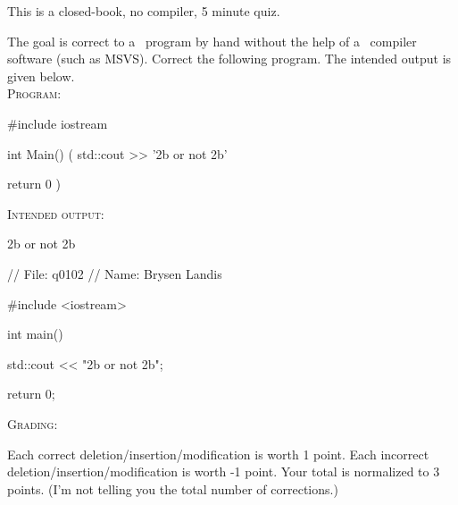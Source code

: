 

This is a closed-book, no compiler, 5 minute quiz.

\nextq
The goal is correct to a \cpp\ program by hand without the help of a \cpp\
compiler software (such as MSVS).
Correct the following program.
The intended output is given below.
\\
\textsc{Program:}
\begin{console}
#include iostream

int Main()
(
    std::cout >> '2b or not 2b'

    return 0
)
\end{console}
\textsc{Intended output:}
\begin{console}
2b or not 2b
\end{console}
\ANSWER
\begin{answercode}
// File: q0102
// Name: Brysen Landis

#include <iostream>

int main()
{
    std::cout << "2b or not 2b\n";

    return 0;
}
\end{answercode}

\textsc{Grading}:
\begin{tightlist}
\li Each correct deletion/insertion/modification is worth 1 point.
\li Each incorrect deletion/insertion/modification is worth -1 point.
\li Your total is normalized to 3 points.
(I'm not telling you the total number of corrections.)
\end{tightlist}


